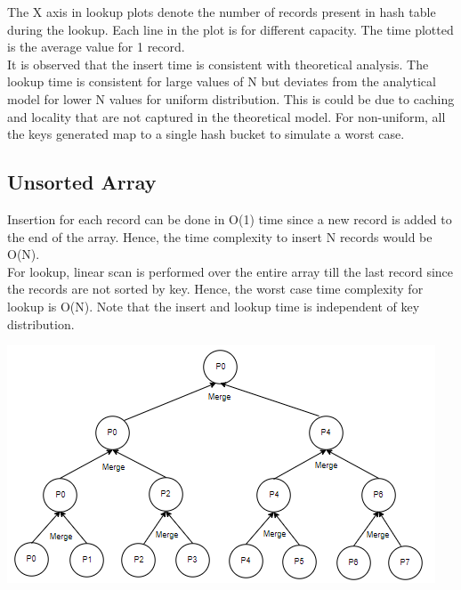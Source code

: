 \documentclass[11pt,a4paper,oneside]{article}
\begin{document}
    The X axis in lookup plots denote the number of records present in hash table during the lookup. Each line in the plot is for different capacity. The time plotted is the average value for 1 record.\\
	
	It is observed that the insert time is consistent with theoretical analysis. The lookup time is consistent for large values of N but deviates from the analytical model for lower N values for uniform distribution. This is could be due to caching and locality that are not captured in the theoretical model. For non-uniform, all the keys generated map to a single hash bucket to simulate a worst case.
	
	\subsection{Unsorted Array}
	Insertion for each record can be done in O(1) time since a new record is added to the end of the array. Hence, the time complexity to insert N records would be O(N). \\
	\newline
	For lookup, linear scan is performed over the entire array till the last record since the records are not sorted by key. Hence, the worst case time complexity for lookup is O(N). Note that the insert and lookup time is independent of key distribution.
	
	\begin{center}
		\includegraphics[scale=0.6]{3.png}		
	\end{center}
	
\end{document}
